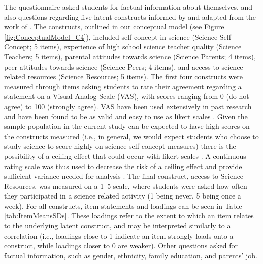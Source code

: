 The questionnaire asked students for factual information about themselves, and also questions regarding five latent constructs informed by and adapted from the work of \cite{dewitt2011high}. The constructs, outlined in our conceptual model (see Figure \ref{fig:ConceptualModel_C4}), included self-concept in science (Science Self-Concept; 5 items), experience of high school science teacher quality (Science Teachers; 5 items), parental attitudes towards science (Science Parents; 4 items), peer attitudes towards science (Science Peers; 4 items), and access to science-related resources (Science Resources; 5 items). The first four constructs were measured through items asking students to rate their agreement regarding a statement on a Visual Analog Scale (VAS), with scores ranging from 0 (do not agree) to 100 (strongly agree). VAS have been used extensively in past research and have been found to be as valid and easy to use as likert scales \citep{hasson2005validation}. Given the sample population in the current study can be expected to have high scores on the constructs measured (i.e., in general, we would expect students who choose to study science to score highly on science self-concept measures) there is the possibility of a ceiling effect that could occur with likert scales \citep{chyung2018evidence}. A continuous rating scale was thus used to decrease the risk of a ceiling effect and provide sufficient variance needed for analysis \citep{chyung2018evidence}. The final construct, access to Science Resources, was measured on a 1--5 scale, where students were asked how often they participated in a science related activity (1 being never, 5 being once a week). For all constructs, item statements and loadings can be seen in Table \ref{tab:ItemMeansSDs}. These loadings refer to the extent to which an item relates to the underlying latent construct, and may be interpreted similarly to a correlation (i.e., loadings close to 1 indicate an item strongly loads onto a construct, while loadings closer to 0 are weaker). Other questions asked for factual information, such as gender, ethnicity, family education, and parents' job. 


